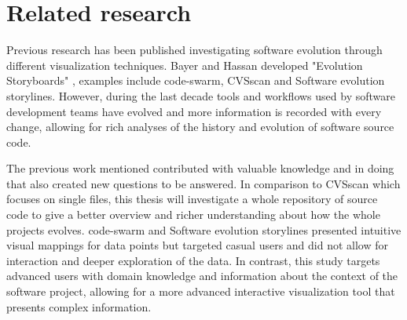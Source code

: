 

\section{Related research}
Previous research has been published investigating software evolution through different visualization techniques. Bayer and Hassan developed "Evolution Storyboards"  , examples include code-swarm, CVSscan and Software evolution storylines. However, during the last decade tools and workflows used by software development teams have evolved and more information is recorded with every change, allowing for rich analyses of the history and evolution of software source code.

The previous work mentioned contributed with valuable knowledge and in doing that also created new questions to be answered. In comparison to CVSscan which focuses on single files, this thesis will investigate a whole repository of source code to give a better overview and richer understanding about how the whole projects evolves. code-swarm and Software evolution storylines presented intuitive visual mappings for data points but targeted casual users and did not allow for interaction and deeper exploration of the data. In contrast, this study targets advanced users with domain knowledge and information about the context of the software project, allowing for a more advanced interactive visualization tool that presents complex information.
